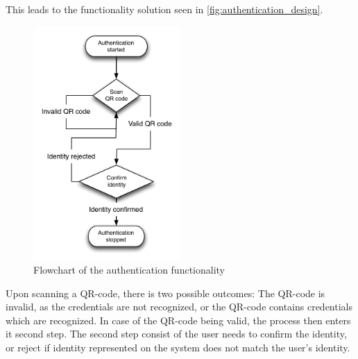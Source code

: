 This leads to the functionality solution seen in \autoref{fig:authentication_design}.
\begin{figure}[h]
	\centering
	\includegraphics[width=0.5\textwidth]{gfx/authentication_design.pdf}
	\caption{Flowchart of the authentication functionality}
	\label{fig:authentication_design}
\end{figure}

Upon scanning a QR-code, there is two possible outcomes: The QR-code is invalid, as the credentials are not recognized, or the QR-code contains credentials which are recognized.
In case of the QR-code being valid, the process then enters it second step. The second step consist of the user needs to confirm the identity, or reject if identity represented on the system does not match the user's identity.

